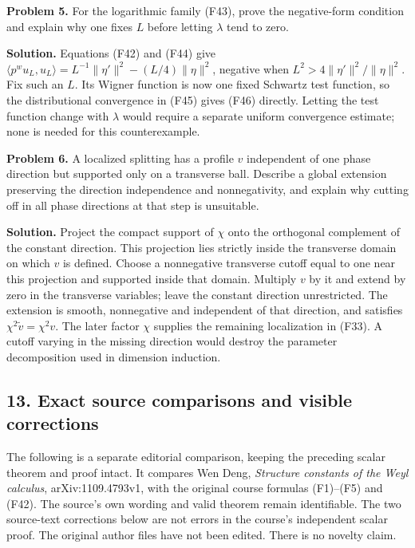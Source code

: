 \documentclass[
  11pt,
]{article}
\makeatletter
\let\ReaderOriginalAnchorStart\hyper@anchorstart
\let\ReaderOriginalAnchorEnd\hyper@anchorend
\let\ReaderPendingAliases\@empty
\def\ReaderArmAliases#1{\gdef\ReaderPendingAliases{#1}}
\def\hyper@anchorstart#1{\ReaderIfNativeAnchorTF{#1}{\ReaderPendingAliases\global\let\ReaderPendingAliases\@empty}{}\ReaderOriginalAnchorStart{#1}}
\makeatother
\begin{document}
\textbf{Problem 5.} For the logarithmic family (F43), prove the
negative-form condition and explain why one fixes \(L\) before letting
\(\lambda\) tend to zero.

\textbf{Solution.} Equations (F42) and (F44) give
\(\langle p^wu_L,u_L\rangle=L^{-1}\|\eta'\|^2-(L/4)\|\eta\|^2\),
negative when \(L^2>4\|\eta'\|^2/\|\eta\|^2\). Fix such an \(L\). Its
Wigner function is now one fixed Schwartz test function, so the
distributional convergence in (F45) gives (F46) directly. Letting the
test function change with \(\lambda\) would require a separate uniform
convergence estimate; none is needed for this counterexample.

\textbf{Problem 6.} A localized splitting has a profile \(v\)
independent of one phase direction but supported only on a transverse
ball. Describe a global extension preserving the direction independence
and nonnegativity, and explain why cutting off in all phase directions
at that step is unsuitable.

\textbf{Solution.} Project the compact support of \(\chi\) onto the
orthogonal complement of the constant direction. This projection lies
strictly inside the transverse domain on which \(v\) is defined. Choose
a nonnegative transverse cutoff equal to one near this projection and
supported inside that domain. Multiply \(v\) by it and extend by zero in
the transverse variables; leave the constant direction unrestricted. The
extension is smooth, nonnegative and independent of that direction, and
satisfies \(\chi^2\widetilde v=\chi^2v\). The later factor \(\chi\)
supplies the remaining localization in (F33). A cutoff varying in the
missing direction would destroy the parameter decomposition used in
dimension induction.

\ReaderArmAliases{\ReaderOriginalAnchorStart{AN03-SFP-SOURCE-001}\ReaderOriginalAnchorEnd\begingroup\expandafter\def\csname @currentHref\endcsname{AN03-SFP-SOURCE-001}\label{AN03-SFP-SOURCE-001}\endgroup\ReaderOriginalAnchorStart{exact-source-comparisons-and-visible-corrections}\ReaderOriginalAnchorEnd}
\subsection{13. Exact source comparisons and visible
corrections}\label{exact-source-comparisons-and-visible-corrections}

The following is a separate editorial comparison, keeping the preceding
scalar theorem and proof intact. It compares Wen Deng, \emph{Structure
constants of the Weyl calculus}, arXiv:1109.4793v1, with the original
course formulas (F1)--(F5) and (F42). The source's own wording and valid
theorem remain identifiable. The two source-text corrections below are
not errors in the course's independent scalar proof. The original author
files have not been edited. There is no novelty claim.
\end{document}
